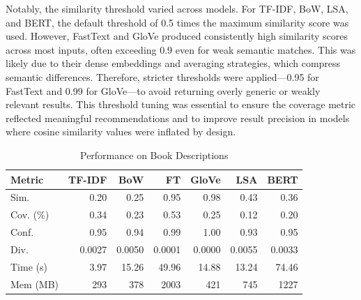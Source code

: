 \documentclass[conference]{IEEEtran}
\begin{document}
%
Notably, the similarity threshold varied across models. For TF-IDF, BoW, LSA, and BERT, the default threshold of 0.5 times the maximum similarity score was used. However, FastText and GloVe produced consistently high similarity scores across most inputs, often exceeding 0.9 even for weak semantic matches. This was likely due to their dense embeddings and averaging strategies, which compress semantic differences. Therefore, stricter thresholds were applied—0.95 for FastText and 0.99 for GloVe—to avoid returning overly generic or weakly relevant results. This threshold tuning was essential to ensure the coverage metric reflected meaningful recommendations and to improve result precision in models where cosine similarity values were inflated by design.

\begin{table}[htbp]
\caption{Performance on Book Descriptions}
\centering
\begin{tabular}{|l|r|r|r|r|r|r|}
\hline
\textbf{Metric} & \textbf{TF-IDF} & \textbf{BoW} & \textbf{FT} & \textbf{GloVe} & \textbf{LSA} & \textbf{BERT} \\
\hline
Sim.      & 0.20 & 0.25 & 0.95 & 0.98 & 0.43 & 0.36 \\
Cov. (\%) & 0.34 & 0.23 & 0.53 & 0.25 & 0.12 & 0.20 \\
Conf.     & 0.95 & 0.94 & 0.99 & 1.00 & 0.93 & 0.95 \\
Div.      & 0.0027 & 0.0050 & 0.0001 & 0.0000 & 0.0055 & 0.0033 \\
Time (s)  & 3.97 & 15.26 & 49.96 & 14.88 & 13.24 & 74.46 \\
Mem (MB)  & 293  & 378 & 2003 & 421 & 745 & 1227 \\
\hline
\end{tabular}
\label{tab:desc}
\end{table}

%
%
%
%
\end{document}
